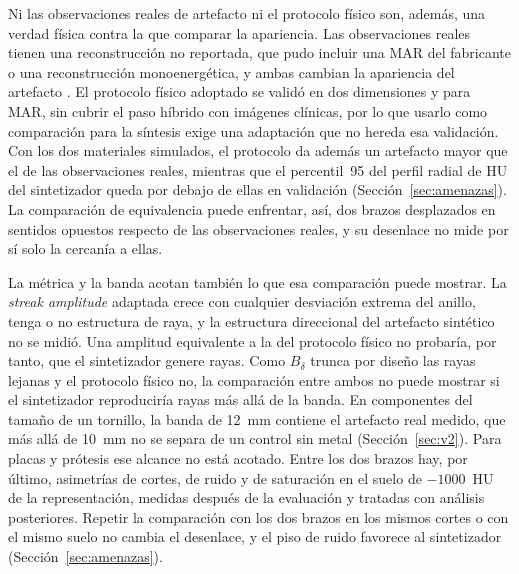 Ni las observaciones reales de artefacto ni el protocolo físico son, además, una verdad física contra la que comparar la apariencia. Las observaciones reales tienen una reconstrucción no reportada, que pudo incluir una MAR del fabricante o una reconstrucción monoenergética, y ambas cambian la apariencia del artefacto \cite{selles2024marreview}. El protocolo físico adoptado se validó en dos dimensiones y para MAR, sin cubrir el paso híbrido con imágenes clínicas, por lo que usarlo como comparación para la síntesis exige una adaptación que no hereda esa validación. Con los dos materiales simulados, el protocolo da además un artefacto mayor que el de las observaciones reales, mientras que el percentil~95 del perfil radial de HU del sintetizador queda por debajo de ellas en validación (Sección~\ref{sec:amenazas}). La comparación de equivalencia puede enfrentar, así, dos brazos desplazados en sentidos opuestos respecto de las observaciones reales, y su desenlace no mide por sí solo la cercanía a ellas.

La métrica y la banda acotan también lo que esa comparación puede mostrar. La \emph{streak amplitude} adaptada crece con cualquier desviación extrema del anillo, tenga o no estructura de raya, y la estructura direccional del artefacto sintético no se midió. Una amplitud equivalente a la del protocolo físico no probaría, por tanto, que el sintetizador genere rayas. Como $B_{\delta}$ trunca por diseño las rayas lejanas y el protocolo físico no, la comparación entre ambos no puede mostrar si el sintetizador reproduciría rayas más allá de la banda. En componentes del tamaño de un tornillo, la banda de 12~mm contiene el artefacto real medido, que más allá de 10~mm no se separa de un control sin metal (Sección~\ref{sec:v2}). Para placas y prótesis ese alcance no está acotado. Entre los dos brazos hay, por último, asimetrías de cortes, de ruido y de saturación en el suelo de $-1000$~HU de la representación, medidas después de la evaluación y tratadas con análisis posteriores. Repetir la comparación con los dos brazos en los mismos cortes o con el mismo suelo no cambia el desenlace, y el piso de ruido favorece al sintetizador (Sección~\ref{sec:amenazas}).

